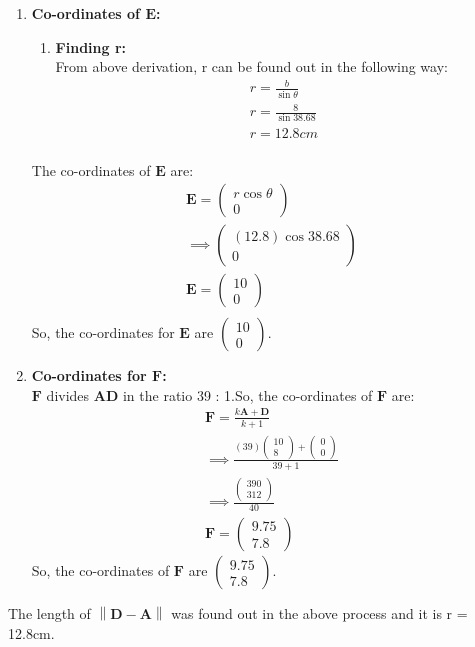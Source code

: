 \documentclass{article}
\providecommand{\norm}[1]{\left\lVert#1\right\rVert}
\newcommand{\myvec}[1]{\ensuremath{\begin{pmatrix}#1\end{pmatrix}}}
\let\vec\mathbf
\begin{document}
\begin{enumerate}
\item \textbf{Co-ordinates of $\vec{E}$:}\\
	\begin{enumerate}
		\item \textbf{Finding r:}\\
From above derivation, r can be found out in the following way:\\
			\begin{align}
				r = \frac{b}{\sin{\theta}}\\
				r = \frac{8}{\sin{38.68}}\\
				r = 12.8cm\\
			\end{align}
	\end{enumerate}
		The co-ordinates of $\vec{E}$ are:
		\begin{align}
			\vec{E} = \myvec{r\cos{\theta}\\0}\\
			\implies \myvec{(12.8)\cos{38.68}\\0}\\
			\vec{E} = \myvec{10\\0}\\
		\end{align}
So, the co-ordinates for $\vec{E}$ are $\myvec{10\\0}$.
\item \textbf{Co-ordinates for $\vec{F}$:}\\
	$\vec{F}$ divides $\vec{AD}$ in the ratio 39 : 1.So, the co-ordinates of $\vec{F}$ are:
		\begin{align}
			\vec{F} = \frac{k\vec{A} + \vec{D}}{k + 1}\\
			\implies \frac{(39)\myvec{10\\8} + \myvec{0\\0}}{39 + 1}\\
			\implies \frac{\myvec{390\\312}}{40}\\
			\vec{F} = \myvec{9.75\\7.8}
		\end{align}
So, the co-ordinates of $\vec{F}$ are $\myvec{9.75\\7.8}$.
\end{enumerate}
		 The length of $\norm{\vec{D} - \vec{A}}$ was found out in the above process and it is r = 12.8cm.
\end{document}
